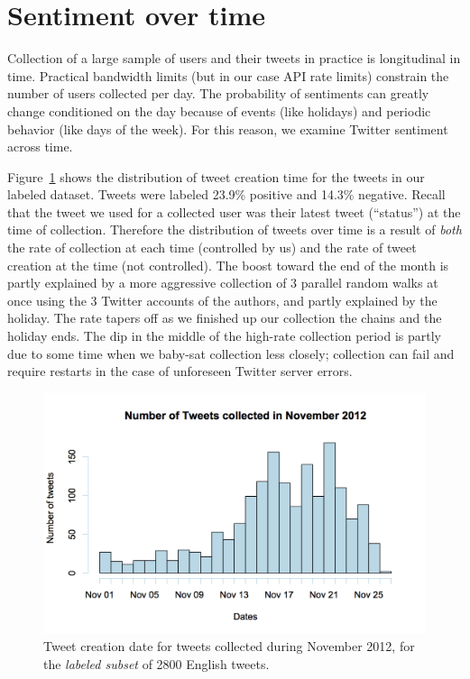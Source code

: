 \section{Sentiment over time} 

Collection of a large sample of users and their tweets in practice is
longitudinal in time. Practical bandwidth limits (but in our
case API rate limits) constrain the number of users collected per day.
The probability of sentiments can greatly change conditioned on the
day because of events (like holidays) and periodic behavior (like days
of the week). For this reason, we examine Twitter sentiment across
time. 

Figure~\ref{fig:time} shows the distribution of tweet
creation time for the tweets in our labeled dataset. Tweets were
labeled 23.9\% positive and 14.3\% negative. Recall that the
tweet we used for a collected user was their latest tweet (``status'')
at the time of collection. Therefore the distribution of tweets over
time is a result of \emph{both} the rate of collection at each time
(controlled by us) and the rate of tweet creation at the time (not
controlled). The boost toward the end of the month is partly
explained by a more aggressive collection of 3 parallel random walks
at once using the 3 Twitter accounts of the authors, and partly
explained by the holiday. The rate tapers off as we finished up our
collection the chains and the holiday ends. The dip in the
middle of the high-rate collection period is partly due to some time
when we baby-sat collection less closely; collection can fail and
require restarts in the case of unforeseen Twitter server errors.

\begin{figure}[htb]
\begin{center}
  \includegraphics[width=0.9\columnwidth]{figs/time.png}
\begin{minipage}{0.9\columnwidth}
\end{minipage}
\end{center}
\caption{Tweet creation date for tweets collected during November 2012, for the \emph{labeled
        subset} of 2800 English tweets.}
\label{fig:time}
\end{figure}


